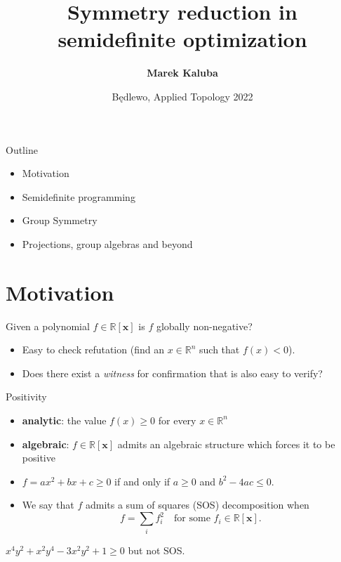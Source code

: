 \documentclass[9pt]{beamer}
\title{Symmetry reduction in semidefinite optimization}
\author{\textbf{Marek Kaluba}} \normalsize
\institute{Karlsruhe Institute for Technology/Heidelberg University}
\date{Będlewo, Applied Topology 2022}
\theoremstyle{definition}
\begin{document}
\frame{\titlepage}

\begin{frame}[standout]{Outline}
\begin{itemize}
   \item Motivation
   \item Semidefinite programming
   \item Group Symmetry
   \item Projections, group algebras and beyond
\end{itemize}
\end{frame}


\section{Motivation}

\begin{frame}[standout]
  Given a polynomial $f \in \mathbb{R}[\mathbf{x}]$ is $f$ globally non-negative?

  \pause
  \begin{itemize}
    \item Easy to check refutation (find an $x\in \mathbb{R}^n$ such that $f(x) < 0$).
    \item Does there exist a \textit{witness} for confirmation that is also easy to verify?
  \end{itemize}

\end{frame}

\begin{frame}{Positivity}

  \begin{itemize}
     \item \textbf{analytic}: the value $f(x) \geqslant 0 $ for every $x \in \mathbb{R}^n$
     \item \textbf{algebraic}: $f\in \mathbb{R}[\mathbf{x}]$ admits an algebraic structure which forces it to be positive
  \end{itemize}

  \pause
  \begin{itemize}
    \item $f = ax^2 + bx + c \geqslant 0$ if and only if $a \geqslant 0$ and $b^2 - 4ac \leqslant 0$.
  \pause
    \item We say that $f$ admits a sum of squares (SOS) decomposition when
    \[
    f = \sum_i f_i^2\quad \text{for some } f_i \in \mathbb{R}[\mathbf{x}].
    \]
  \end{itemize}
  \pause
  \begin{example}[Motzkin, 1967]
    $x^4y^2 + x^2y^4 - 3 x^2y^2 + 1 \geqslant 0$ but not SOS.
  \end{example}
\end{frame}
\end{document}
